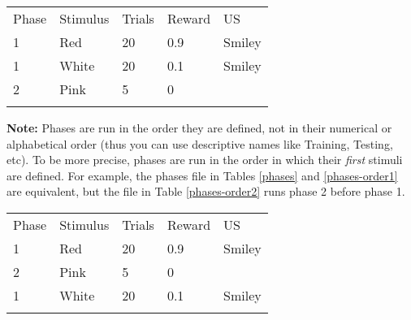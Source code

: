 \documentclass[11pt,]{article}
\renewcommand{\medskip}{}
\begin{document}
\begin{table*}[t]\begin{center}\small\begin{tabular}{@{}lllll@{}}
\hline\noalign{\medskip}
Phase & Stimulus & Trials & Reward & US
\\\noalign{\medskip}
\hline\noalign{\medskip}
1 & Red & 20 & 0.9 & Smiley
\\\noalign{\medskip}
1 & White & 20 & 0.1 & Smiley
\\\noalign{\medskip}
2 & Pink & 5 & 0 &
\\\noalign{\medskip}
\hline
\noalign{\medskip}
\end{tabular}\caption{A simple \texttt{Phases.csv} to teach a discrimination between
stimuli Red and White, and then testing responding to Pink. Note that
the US field can be left empty if the Reward probability is 0.
\label{phases}}
\end{center}\end{table*}

\textbf{Note:} Phases are run in the order they are defined, not in
their numerical or alphabetical order (thus you can use descriptive
names like Training, Testing, etc). To be more precise, phases are run
in the order in which their \emph{first} stimuli are defined. For
example, the phases file in Tables \ref{phases} and \ref{phases-order1}
are equivalent, but the file in Table \ref{phases-order2} runs phase 2
before phase 1.

\begin{table*}[t]\begin{center}\small\begin{tabular}{@{}lllll@{}}
\hline\noalign{\medskip}
Phase & Stimulus & Trials & Reward & US
\\\noalign{\medskip}
\hline\noalign{\medskip}
1 & Red & 20 & 0.9 & Smiley
\\\noalign{\medskip}
2 & Pink & 5 & 0 &
\\\noalign{\medskip}
1 & White & 20 & 0.1 & Smiley
\\\noalign{\medskip}
\hline
\noalign{\medskip}
\end{tabular}\caption{With this \texttt{Phases.csv} file, alex will run phase 1
before phase 2 (cf.~Table \ref{phases-order2}. \label{phases-order1}}
\end{center}\end{table*}
\end{document}

